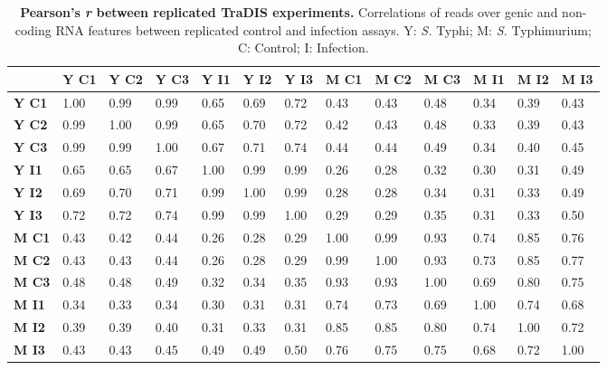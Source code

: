 %
\begin{table}
   \tiny
   \centering
   \noindent
    \caption[Pearson's {\it r} between replicated TraDIS experiments]{\textbf{Pearson's {\it r} between replicated TraDIS experiments.} Correlations of reads over genic and non-coding RNA features between replicated control and infection assays. Y: \textit{S.} Typhi; M: \textit{S.} Typhimurium; C: Control; I: Infection. }
    \begin{tabular}{ l
    				l
				l
				l
				l
				l
				l
				l
				l
				l
				l
				l
				l
				}
   
    \\
     \toprule
    &\textbf{Y C1} & \textbf{Y C2} & \textbf{Y C3} & \textbf{Y I1} & \textbf{Y I2} & \textbf{Y I3} &  \textbf{M C1}&  \textbf{M C2} &  \textbf{M C3} &  \textbf{M I1}&  \textbf{M I2}&  \textbf{M I3}\\
    \midrule
\textbf{Y C1} &   1.00 & 0.99 & 0.99 & 0.65 & 0.69 & 0.72 & 0.43 & 0.43 & 0.48 & 0.34 & 0.39 & 0.43\\
\textbf{Y C2} &  0.99 & 1.00 & 0.99 & 0.65 & 0.70 & 0.72 & 0.42 & 0.43 & 0.48 & 0.33 & 0.39 & 0.43\\
 \textbf{Y C3} & 0.99 & 0.99 & 1.00 & 0.67 & 0.71 & 0.74 & 0.44 & 0.44 & 0.49 & 0.34 & 0.40 & 0.45\\
 \textbf{Y I1} & 0.65 & 0.65 & 0.67 & 1.00 & 0.99 & 0.99 & 0.26 & 0.28 & 0.32 & 0.30 & 0.31 & 0.49\\
\textbf{Y I2} &  0.69 & 0.70 & 0.71 & 0.99 & 1.00 & 0.99 & 0.28 & 0.28 & 0.34 & 0.31 & 0.33 & 0.49\\
  \textbf{Y I3} & 0.72 & 0.72 & 0.74 & 0.99 & 0.99 & 1.00 & 0.29 & 0.29 & 0.35 & 0.31 & 0.33 & 0.50\\
 \textbf{M C1}&  0.43 & 0.42 & 0.44 & 0.26 & 0.28 & 0.29 & 1.00 & 0.99 & 0.93 & 0.74 & 0.85 & 0.76\\
\textbf{M C2}&  0.43 & 0.43 & 0.44 & 0.26 & 0.28 & 0.29 & 0.99 & 1.00 & 0.93 & 0.73 & 0.85 & 0.77\\
 \textbf{M C3} &  0.48 & 0.48 & 0.49 & 0.32 & 0.34 & 0.35 & 0.93 & 0.93 & 1.00 & 0.69 & 0.80 & 0.75\\
 \textbf{M I1} & 0.34 & 0.33 & 0.34 & 0.30 & 0.31 & 0.31 & 0.74 & 0.73 & 0.69 & 1.00 & 0.74 & 0.68\\
  \textbf{M I2} & 0.39 & 0.39 & 0.40 & 0.31 & 0.33 & 0.31 & 0.85 & 0.85 & 0.80 & 0.74 & 1.00 & 0.72\\
 \textbf{M I3} &  0.43 & 0.43 & 0.45 & 0.49 & 0.49 & 0.50 & 0.76 & 0.75 & 0.75 & 0.68 & 0.72 & 1.00\\
    \bottomrule
    \end{tabular}%
    \label{tab:pear}%
\end{table}

